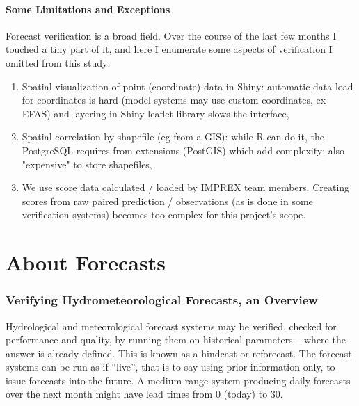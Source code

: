 \documentclass[logos,parttoc,morelanguage=french,morelanguage=german]{orsay-memoire}
\begin{document}
\subsection{Some Limitations and Exceptions}

Forecast verification is a broad field. Over the course of the last few months I touched a tiny part of it, and here I enumerate some aspects of verification I omitted from this study:
\begin{enumerate}
	\item Spatial visualization of point (coordinate) data in Shiny: automatic data load for coordinates is hard (model systems may use custom coordinates, ex \gls{EFAS}) and layering in Shiny leaflet library slows the interface,
    \item Spatial correlation by shapefile (eg from a GIS): while R can do it, the PostgreSQL requires from extensions (PostGIS) which add complexity; also "expensive" to store shapefiles,
    \item We use score data calculated / loaded by IMPREX team members. Creating scores from raw paired prediction / observations (as is done in some verification systems) becomes too complex for this project's scope.
\end{enumerate}
%
%


\part{About Forecasts}

\section{Verifying Hydrometeorological Forecasts, an Overview}

Hydrological and meteorological forecast systems may be verified, checked for performance and quality, by running them on historical parameters -- where the answer is already defined. This is known as a hindcast or reforecast. The forecast systems can be run as if ``live'', that is to say using prior information only, to issue forecasts into the future. A medium-range system producing daily forecasts over the next month might have lead times from 0 (today) to 30.
\end{document}
